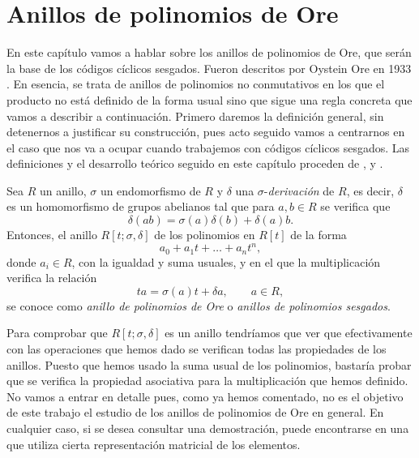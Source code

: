 \chapter{Anillos de polinomios de Ore}

En este capítulo vamos a hablar sobre los anillos de polinomios de Ore, que serán la base de los códigos cíclicos sesgados.
Fueron descritos por Oystein Ore en 1933 \parencite{ore_theory_1933}.
En esencia, se trata de anillos de polinomios no conmutativos en los que el producto no está definido de la forma usual sino que sigue una regla concreta que vamos a describir a continuación. 
Primero daremos la definición general, sin detenernos a justificar su construcción, pues acto seguido vamos a centrarnos en el caso que nos va a ocupar cuando trabajemos con códigos cíclicos sesgados.
Las definiciones y el desarrollo teórico seguido en este capítulo proceden de \parencite{jacobson_finite-dimensional_1996}, \parencite{ore_theory_1933} y \parencite{gomez-torrecillas_factoring_2020}.

\begin{definition}
  Sea \(R\) un anillo, \(\sigma\) un endomorfismo de \(R\) y \(\delta\) una \(\sigma\)-\textit{derivación} de \(R\), es decir, \(\delta\) es un homomorfismo de grupos abelianos tal que para \(a, b \in R\) se verifica que
  \[
    \delta(ab) = \sigma(a)\delta(b) + \delta(a)b.
  \]
  Entonces, el anillo \(R[t; \sigma, \delta]\) de los polinomios en \(R[t]\) de la forma
  \[
    a_0 + a_1t + \dots + a_nt^n,
  \]
  donde \(a_i \in R\), con la igualdad y suma usuales, y en el que la multiplicación verifica la relación 
  \[
  ta = \sigma(a)t + \delta a, \qquad a \in R,
  \]
  se conoce como \textit{anillo de polinomios de Ore} o \textit{anillos de polinomios sesgados}.
\end{definition}

Para comprobar que \(R[t; \sigma, \delta]\) es un anillo tendríamos que ver que efectivamente con las operaciones que hemos dado se verifican todas las propiedades de los anillos.
Puesto que hemos usado la suma usual de los polinomios, bastaría probar que se verifica la propiedad asociativa para la multiplicación que hemos definido.
No vamos a entrar en detalle pues, como ya hemos comentado, no es el objetivo de este trabajo el estudio de los anillos de polinomios de Ore en general.
En cualquier caso, si se desea consultar una demostración, puede encontrarse en \parencite[p. 2-3]{jacobson_finite-dimensional_1996} una que utiliza cierta representación matricial de los elementos.

